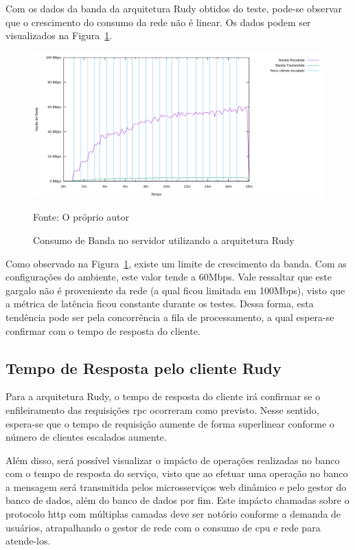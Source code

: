 Com os dados da banda da arquitetura Rudy obtidos do teste, pode-se observar que o crescimento do consumo da rede não é linear.
%
Os dados podem ser visualizados na Figura~\ref{fig:rudy_t4_io}.

\begin{figure}[htb!]
    \caption{Consumo de Banda no servidor utilizando a arquitetura Rudy}
    \label{fig:rudy_t4_io}
    \includegraphics[width=\textwidth]{metricas_rudy_t4/io.png}
    \centering
    
    Fonte: O próprio autor
\end{figure}

Como observado na Figura~\ref{fig:rudy_t4_io}, existe um limite de crescimento da banda.
%
Com as configurações do ambiente, este valor tende a 60Mbps.
%
Vale ressaltar que este gargalo não é proveniente da rede (a qual ficou limitada em 100Mbps), visto que a métrica de latência ficou constante durante os testes.
%
Dessa forma, esta tendência pode ser pela concorrência a fila de processamento, a qual espera-se confirmar com o tempo de resposta do cliente.

\subsection{Tempo de Resposta pelo cliente Rudy}

Para a arquitetura Rudy, o tempo de resposta do cliente irá confirmar se o enfileiramento das requisições \ac{rpc} ocorreram como previsto.
%
Nesse sentido, espera-se que o tempo de requisição aumente de forma superlinear conforme o número de clientes escalados aumente.


Além disso, será possível visualizar o impácto de operações realizadas no banco com o tempo de resposta do serviço, visto que ao efetuar uma operação no banco a mensagem será transmitida pelos microsserviços web dinâmico e pelo gestor do banco de dados, além do banco de dados por fim.
%
Este impácto chamadas sobre o protocolo \ac{http} com múltiplas camadas deve ser notório conforme a demanda de usuários, atrapalhando o gestor de rede com o consumo de \ac{cpu} e rede para atende-los.

